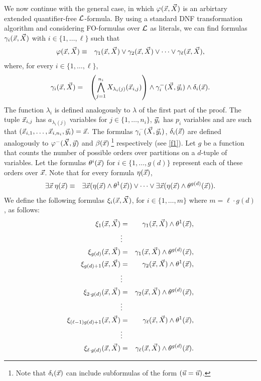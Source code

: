 We now continue with the general case, in which $\varphi(\vec{x},\vec{X})$ is an arbirtary extended quantifier-free ${\cal L}$-formula. By using a standard DNF transformation algorithm and considering FO-formulas over ${\cal L}$ as literals, we can find formulas $\gamma_i(\vec{x},\vec{X})$ with $i\in\{1,\ldots,\ell\}$ such that
\begin{eqnarray*}
\varphi(\vec{x},\vec{X}) &\equiv& \gamma_1(\vec{x},\vec{X}) \vee \gamma_2(\vec{x},\vec{X}) \vee \dots  \vee \gamma_{\ell}(\vec{x},\vec{X}),
\end{eqnarray*}
where, for every $i\in\{1,\ldots,\ell\}$, 
\begin{eqnarray*}
\gamma_i(\vec{x},\vec{X}) &=& \left( \bigwedge_{j=1}^{n_i} X_{\lambda_i(j)}(\vec{x}_{i,j}) \right) \wedge \gamma^{-}_i(\vec{X},\vec{y}_i)  \wedge \delta_i(\vec{x}).
\end{eqnarray*}
The function $\lambda_i$ is defined analogously to $\lambda$ of the first part of the proof. The tuple $\vec{x}_{i,j}$ has $a_{\lambda_i(j)}$ variables for $j\in\{1,\ldots,n_i\}$, $\vec{y}_i$ has $p_i$ variables and are such that $(\vec{x}_{i,1},\ldots,\vec{x}_{i,n_i},\vec{y}_i) = \vec{x}.$ The formulas $\gamma^{-}_i(\vec{X},\vec{y}_i)$, $\delta_i(\vec{x})$ are defined analogously to $\varphi^{-}(\vec{X},\vec{y})$ and $\beta(\vec{x})\,$\footnote[2]{Note that $\delta_i(\vec{x})$ can include subformulas of the form $(\vec{u} = \vec{u})$.} respectively (see \eqref{f1}). Let $g$ be a function that counts the number of possible orders over partitions on a $d$-tuple of variables. Let the formulas $\theta^i(\vec{x})$ for $i\in\{1,\ldots,g(d)\}$ represent each of these orders over $\vec{x}$. Note that for every formula $\eta(\vec{x})$,
\begin{eqnarray*}
\exists\vec{x}\:\eta(\vec{x}) &\equiv& \exists\vec{x}(\eta(\vec{x})\wedge\theta^1(\vec{x})) \vee \cdots \vee \exists\vec{x}(\eta(\vec{x})\wedge\theta^{g(d)}(\vec{x})).
\end{eqnarray*}
We define the following formulas $\xi_i(\vec{x},\vec{X})$, for $i\in\{1,\ldots,m\}$ where $m = \ell \cdot g(d)$, as follows: 
\begin{eqnarray*}
\xi_1(\vec{x},\vec{X}) &=& \gamma_1(\vec{x},\vec{X}) \wedge \theta^1(\vec{x}), \\
& \vdots & \\
\xi_{g(d)}(\vec{x},\vec{X}) &=& \gamma_1(\vec{x},\vec{X}) \wedge \theta^{g(d)}(\vec{x}), \\
\xi_{g(d)+1}(\vec{x},\vec{X}) &=& \gamma_2(\vec{x},\vec{X}) \wedge \theta^1(\vec{x}), \\
& \vdots & \\
\xi_{2\cdot g(d)}(\vec{x},\vec{X}) &=& \gamma_2(\vec{x},\vec{X}) \wedge \theta^{g(d)}(\vec{x}), \\
& \vdots & \\
\xi_{(\ell-1) g(d)+1}(\vec{x},\vec{X}) &=& \gamma_{\ell}(\vec{x},\vec{X}) \wedge \theta^1(\vec{x}), \\
& \vdots & \\
\xi_{\ell \cdot g(d)}(\vec{x},\vec{X}) &=& \gamma_{\ell}(\vec{x},\vec{X}) \wedge \theta^{g(d)}(\vec{x}).
\end{eqnarray*}
